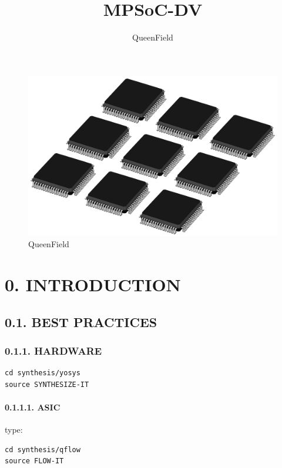 \documentclass[
]{article}
\title{MPSoC-DV}
\author{QueenField}
\date{}
\begin{document}
\maketitle

\begin{figure}
\centering
\includegraphics{../icon.jpg}
\caption{QueenField}
\end{figure}

\hypertarget{introduction}{%
\section{0. INTRODUCTION}\label{introduction}}

\hypertarget{best-practices}{%
\subsection{0.1. BEST PRACTICES}\label{best-practices}}

\hypertarget{hardware}{%
\subsubsection{0.1.1. HARDWARE}\label{hardware}}

\begin{verbatim}
cd synthesis/yosys
source SYNTHESIZE-IT
\end{verbatim}

\hypertarget{asic}{%
\paragraph{0.1.1.1. ASIC}\label{asic}}

type:

\begin{verbatim}
cd synthesis/qflow
source FLOW-IT
\end{verbatim}
\end{document}
